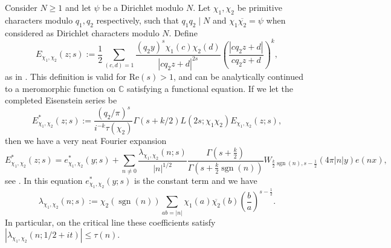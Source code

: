 \documentclass{article}
\theoremstyle{named}
\newcommand{\CC}{\mathbb{C}}
\DeclareMathOperator{\sgn}{sgn}
\begin{document}
Consider $N \geq 1$ and let $\psi$ be a Dirichlet modulo $N$. Let $\chi_1, \chi_2$ be primitive characters modulo $q_1, q_2$ respectively, such that $q_1q_2 \mid N$ and $\chi_1\overline{\chi_2} = \psi$ when considered as Dirichlet characters modulo $N$. Define
\begin{equation*}
    E_{\chi_1, \chi_2}(z; s) := \frac{1}{2}\sum_{(c, d) = 1}\frac{(q_2y)^s\chi_1(c)\chi_2(d)}{|cq_2 z + d|^{2s}}\left(\frac{|cq_2z + d|}{cq_2z + d}\right)^k,
\end{equation*}
as in \cite[Equation (3.3)]{youngeisensteinseries}.
This definition is valid for $\text{Re}(s) > 1$, and can be analytically continued to a meromorphic function on $\CC$ satisfying a functional equation. If we let the completed Eisenstein series be
\begin{equation}\label{eq:completedeisenstein}
    E^*_{\chi_1, \chi_2}(z; s) := \frac{(q_2/\pi)^s}{i^{-k}\tau(\chi_2)}\Gamma(s + k/2)L(2s; \chi_1\chi_2)E_{\chi_1, \chi_2}(z; s),
\end{equation}
then we have a very neat Fourier expansion 
\begin{equation}\label{eq:fourierexpansioncompletedeisenstein}
    E^*_{\chi_1, \chi_2}(z; s) = e^*_{\chi_1, \chi_2}(y; s) + \sum_{n \neq 0} \frac{\lambda_{\chi_1, \chi_2}(n; s)}{|n|^{1/2}} \frac{\Gamma(s + \frac{k}{2})}{\Gamma(s + \frac{k}{2}\sgn(n))}W_{\frac{k}{2}\sgn(n), s - \frac{1}{2}}(4\pi |n|y)e(nx),
\end{equation}
see \cite[Proposition 4.1]{youngeisensteinseries}. In this equation $e^*_{\chi_1, \chi_2}(y; s)$ is the constant term and we have 
\begin{equation*}
    \lambda_{\chi_1, \chi_2}(n; s) :=\chi_2(\sgn(n))\sum_{ab = |n|} \chi_1(a)\overline{\chi_2}(b)\left(\frac{b}{a}\right)^{s-\frac{1}{2}}.
\end{equation*}
In particular, on the critical line these coefficients satisfy $|\lambda_{\chi_1, \chi_2}(n; 1/2 + it)| \leq \tau(n)$. 
\end{document}
